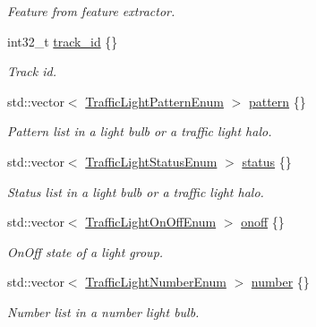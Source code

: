 \begin{DoxyCompactItemize}
\begin{DoxyCompactList}\small\item\em Feature from feature extractor. \end{DoxyCompactList}\item 
int32\+\_\+t \hyperlink{structmaf__perception__interface_1_1TrafficLightSingleFrame_a2cc124033aa9477b38d9033c5725da3f}{track\+\_\+id} \{\}
\begin{DoxyCompactList}\small\item\em Track id. \end{DoxyCompactList}\item 
std\+::vector$<$ \hyperlink{structmaf__perception__interface_1_1TrafficLightPatternEnum}{Traffic\+Light\+Pattern\+Enum} $>$ \hyperlink{structmaf__perception__interface_1_1TrafficLightSingleFrame_a27b0f09898b5233bebcad9fe56f54390}{pattern} \{\}
\begin{DoxyCompactList}\small\item\em Pattern list in a light bulb or a traffic light halo. \end{DoxyCompactList}\item 
std\+::vector$<$ \hyperlink{structmaf__perception__interface_1_1TrafficLightStatusEnum}{Traffic\+Light\+Status\+Enum} $>$ \hyperlink{structmaf__perception__interface_1_1TrafficLightSingleFrame_adce001d2ebe0c3096b66ca78ea9e2054}{status} \{\}
\begin{DoxyCompactList}\small\item\em Status list in a light bulb or a traffic light halo. \end{DoxyCompactList}\item 
std\+::vector$<$ \hyperlink{structmaf__perception__interface_1_1TrafficLightOnOffEnum}{Traffic\+Light\+On\+Off\+Enum} $>$ \hyperlink{structmaf__perception__interface_1_1TrafficLightSingleFrame_aed39a75cdbe67224f380597539b8effb}{onoff} \{\}
\begin{DoxyCompactList}\small\item\em On\+Off state of a light group. \end{DoxyCompactList}\item 
std\+::vector$<$ \hyperlink{structmaf__perception__interface_1_1TrafficLightNumberEnum}{Traffic\+Light\+Number\+Enum} $>$ \hyperlink{structmaf__perception__interface_1_1TrafficLightSingleFrame_ad46ef5150250a3f30958697388e0a9c5}{number} \{\}
\begin{DoxyCompactList}\small\item\em Number list in a number light bulb. \end{DoxyCompactList}\item 

\end{DoxyCompactItemize}
